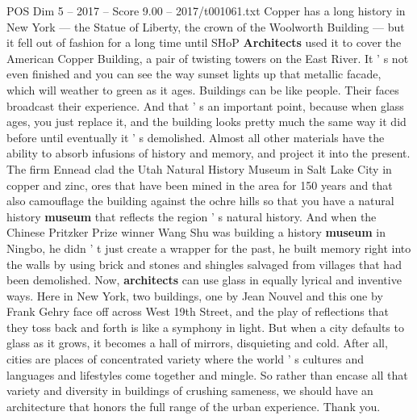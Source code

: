 \begin{textsample}{POS Dim 5 – 2017 – Score 9.00 – 2017/t001061.txt}
Copper has a long history in New York — the Statue of Liberty, the crown of the Woolworth Building — but it fell out of fashion for a long time until SHoP \textbf{Architects} used it to cover the American Copper Building, a pair of twisting towers on the East River.
It ' s not even finished and you can see the way sunset lights up that metallic facade, which will weather to green as it ages.
Buildings can be like people.
Their faces broadcast their experience.
And that ' s an important point, because when glass ages, you just replace it, and the building looks pretty much the same way it did before until eventually it ' s demolished.
Almost all other materials have the ability to absorb infusions of history and memory, and project it into the present.
The firm Ennead clad the Utah Natural History Museum in Salt Lake City in copper and zinc, ores that have been mined in the area for 150 years and that also camouflage the building against the ochre hills so that you have a natural history \textbf{museum} that reflects the region ' s natural history.
And when the Chinese Pritzker Prize winner Wang Shu was building a history \textbf{museum} in Ningbo, he didn ' t just create a wrapper for the past, he built memory right into the walls by using brick and stones and shingles salvaged from villages that had been demolished.
Now, \textbf{architects} can use glass in equally lyrical and inventive ways.
Here in New York, two buildings, one by Jean Nouvel and this one by Frank Gehry face off across West 19th Street, and the play of reflections that they toss back and forth is like a symphony in light.
But when a city defaults to glass as it grows, it becomes a hall of mirrors, disquieting and cold.
After all, cities are places of concentrated variety where the world ' s cultures and languages and lifestyles come together and mingle.
So rather than encase all that variety and diversity in buildings of crushing sameness, we should have an architecture that honors the full range of the urban experience.
Thank you.

\end{textsample}
